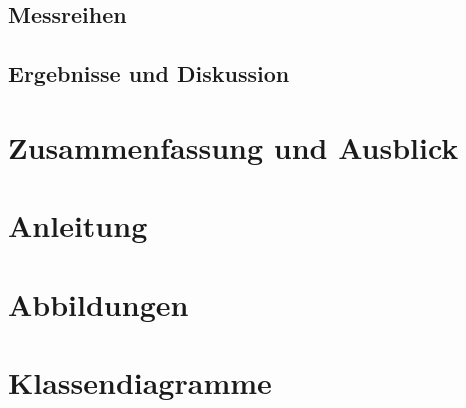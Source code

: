 \documentclass[
    11pt, %
    DIV=11,
    ngerman, %
    a4paper, %
    twoside, %
    titlepage, %
    parskip=half, %
    headings=normal, %
    listof=totoc, %
    bibliography=totoc, %
    index=totoc, %
    captions=tableheading, %
    final %
]{scrreprt}
\begin{document}
	\section{Messreihen}
		
	\section{Ergebnisse und Diskussion}
		

\chapter{Zusammenfassung und Ausblick}
	



\renewcommand{\refname}{Literatur- und Webverzeichnis}
\RaggedRight


\begin{appendix}
    \chapter{Anleitung}
    \label{sec:Anhang}
    \setdefaultleftmargin{1em}{}{}{}{}{}
    
    \chapter{Abbildungen}
    \setdefaultleftmargin{1em}{}{}{}{}{}
    
    
    \chapter{Klassendiagramme}
    \setdefaultleftmargin{1em}{}{}{}{}{}
    
\end{appendix}

\end{document}
